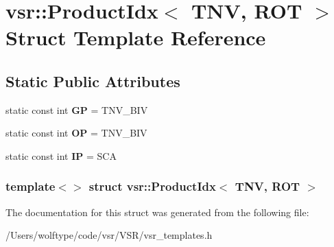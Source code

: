 \hypertarget{structvsr_1_1_product_idx_3_01_t_n_v_00_01_r_o_t_01_4}{\section{vsr\-:\-:Product\-Idx$<$ T\-N\-V, R\-O\-T $>$ Struct Template Reference}
\label{structvsr_1_1_product_idx_3_01_t_n_v_00_01_r_o_t_01_4}
}
\subsection*{Static Public Attributes}
\begin{DoxyCompactItemize}
\item 
\hypertarget{structvsr_1_1_product_idx_3_01_t_n_v_00_01_r_o_t_01_4_a0d4b42b3ade8a406f93ca4192ab6a402}{static const int {\bfseries G\-P} = T\-N\-V\-\_\-\-B\-I\-V}\label{structvsr_1_1_product_idx_3_01_t_n_v_00_01_r_o_t_01_4_a0d4b42b3ade8a406f93ca4192ab6a402}

\item 
\hypertarget{structvsr_1_1_product_idx_3_01_t_n_v_00_01_r_o_t_01_4_a52bc7022d5eaf014970dde95b6433503}{static const int {\bfseries O\-P} = T\-N\-V\-\_\-\-B\-I\-V}\label{structvsr_1_1_product_idx_3_01_t_n_v_00_01_r_o_t_01_4_a52bc7022d5eaf014970dde95b6433503}

\item 
\hypertarget{structvsr_1_1_product_idx_3_01_t_n_v_00_01_r_o_t_01_4_a4d2b04e623fa50e5631293f39e0ca544}{static const int {\bfseries I\-P} = S\-C\-A}\label{structvsr_1_1_product_idx_3_01_t_n_v_00_01_r_o_t_01_4_a4d2b04e623fa50e5631293f39e0ca544}

\end{DoxyCompactItemize}
\subsubsection*{template$<$$>$ struct vsr\-::\-Product\-Idx$<$ T\-N\-V, R\-O\-T $>$}



The documentation for this struct was generated from the following file\-:\begin{DoxyCompactItemize}
\item 
/\-Users/wolftype/code/vsr/\-V\-S\-R/vsr\-\_\-templates.\-h\end{DoxyCompactItemize}

